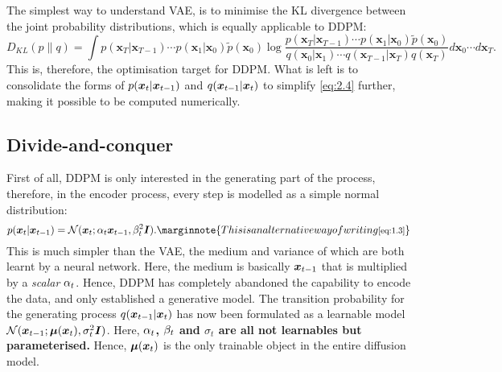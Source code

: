 The simplest way to understand VAE, is to minimise the KL divergence between the joint probability distributions, which is equally applicable to DDPM:
\begin{equation}
    \label{eq:2.4}
    D_{KL}(p\|q)=\int p(\bm{x}_T|\bm{x}_{T-1})\cdots p(\bm{x}_1|\bm{x}_0)\tilde{p}(\bm{x}_{0}) \log\frac{p(\bm{x}_T|\bm{x}_{T-1})\cdots p(\bm{x}_1|\bm{x}_0)\tilde{p}(\bm{x}_{0})}{q(\bm{x}_0|\bm{x}_1)\cdots q(\bm{x}_{T-1}|\bm{x}_{T})q(\bm{x}_T)}d\bm{x}_0\cdots d\bm{x}_T.
\end{equation}
This is, therefore, the optimisation target for DDPM. What is left is to consolidate the forms of $p(\bm{x}_{t}|\bm{x}_{t-1})$ and $q(\bm{x}_{t-1}|\bm{x}_{t})$ to simplify \cref{eq:2.4} further, making it possible to be computed numerically.

\subsection{Divide-and-conquer}
First of all, DDPM is only interested in the generating part of the process, therefore, in the encoder process, every step is modelled as a simple normal distribution:
\begin{equation*}
    p(\xt|\xtm)=\mathcal{N}(\xt;\alphat\xtm,\betat^2\bm{I}).\marginnote{\footnotesize{This is an alternative way of writing \cref{eq:1.3}}}
\end{equation*}
This is much simpler than the VAE,  the medium and variance of which are both learnt by a neural network. Here, the medium is basically $\bm{x}_{t-1}$ that is multiplied by a \emph{scalar} $\alpha_t$. Hence, DDPM has completely abandoned the capability to encode the data, and only established a generative model. The transition probability for the generating process $q(\bm{x}_{t-1}|\bm{x}_{t})$ has now been formulated as a learnable model $\mathcal{N}(\bm{x}_{t-1};\bm{\mu}(\bm{x}_{t}),\sigma_t^2\bm{I})$. Here, \textbf{$\alpha_t$, $\beta_t$ and $\sigma_t$ are all not learnables but parameterised.} Hence, $\bm{\mu}(\bm{x}_{t})$ is the only trainable object in the entire diffusion model.

